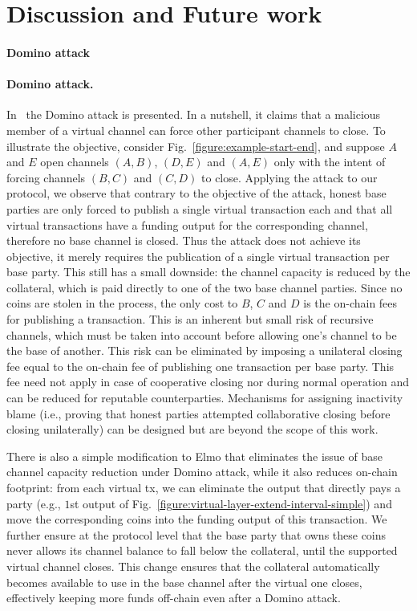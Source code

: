 \section{Discussion and Future work}
\label{sec:future-work}
\makeatletter%
%
  {\paragraph{Domino attack}}%
  {\paragraph{Domino attack.}}%
\makeatother%
In~\cite{donner} the Domino attack is presented. In a nutshell, it claims that a
malicious member of a virtual channel can force other participant channels to close. To illustrate the objective, consider
 Fig.~\ref{figure:example-start-end}, and suppose $A$ and $E$ open channels
$(A, B)$, $(D, E)$ and $(A, E)$ only with the intent of forcing channels $(B,
C)$ and $(C, D)$ to close. Applying the attack to our protocol, we observe that contrary to the objective of the attack,  honest base parties are only
forced to publish a single virtual transaction each and that all virtual
transactions have a funding output for the corresponding channel, therefore no
base channel is closed. Thus the attack does not achieve its objective, it merely requires the publication of a single virtual transaction per base
party. This still has a small downside: 
the channel capacity is reduced by the collateral, which
is paid directly to one of the two base channel parties. Since no coins are
stolen in the process, the only cost to $B$, $C$ and $D$ is the on-chain fees
for publishing a transaction. This is an inherent but small risk of
recursive channels, which must be taken into account before allowing one's
channel to be the base of another. This risk can be eliminated by imposing a
unilateral closing fee equal to the on-chain fee of publishing one transaction
per base party. This fee need not apply in case of cooperative closing nor
during normal operation and can be reduced for reputable counterparties.
Mechanisms for assigning inactivity blame (i.e., proving that honest parties
attempted collaborative closing before closing unilaterally) can be designed but
are beyond the scope of this work.

There is also a simple modification to Elmo that eliminates the issue of base channel capacity reduction under Domino attack, while it also reduces on-chain
footprint: from each virtual tx, we can
eliminate the output that directly
pays a party (e.g., $1$st output of
Fig.~\ref{figure:virtual-layer-extend-interval-simple}) and move the
corresponding coins into the funding output of this transaction. We further
ensure at the protocol level that the base party that owns these coins never
allows its channel balance to fall below the collateral, until the supported
virtual channel closes. This change ensures that the collateral
automatically becomes available to use in the base channel after the virtual one
closes, effectively keeping more funds off-chain even after a Domino attack.

